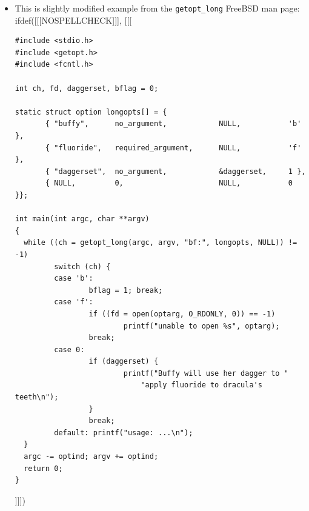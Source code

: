 \begin{itemize}
\item This is slightly modified example from the \texttt{getopt\_long}
FreeBSD man page:
ifdef([[[NOSPELLCHECK]]], [[[
{\footnotesize
\begin{verbatim}
#include <stdio.h>
#include <getopt.h>
#include <fcntl.h>

int ch, fd, daggerset, bflag = 0;

static struct option longopts[] = {
       { "buffy",      no_argument,            NULL,           'b' },
       { "fluoride",   required_argument,      NULL,           'f' },
       { "daggerset",  no_argument,            &daggerset,     1 },
       { NULL,         0,                      NULL,           0 }};

int main(int argc, char **argv)
{
  while ((ch = getopt_long(argc, argv, "bf:", longopts, NULL)) != -1)
         switch (ch) {
         case 'b':
                 bflag = 1; break;
         case 'f':
                 if ((fd = open(optarg, O_RDONLY, 0)) == -1)
                         printf("unable to open %s", optarg);
                 break;
         case 0:
                 if (daggerset) {
                         printf("Buffy will use her dagger to "
                             "apply fluoride to dracula's teeth\n");
                 }
                 break;
         default: printf("usage: ...\n");
  }
  argc -= optind; argv += optind;
  return 0;
}
\end{verbatim}
]]])
}
\end{itemize}


\begin{slide}

\end{slide}

